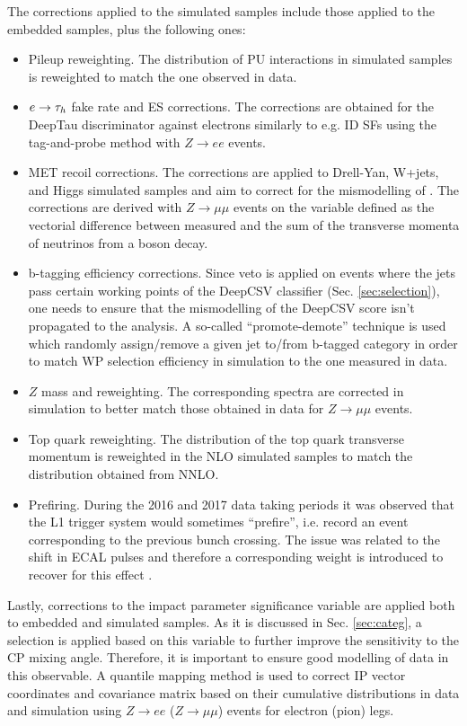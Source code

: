 The corrections applied to the simulated samples include those applied to the embedded samples, plus the following ones:
\begin{itemize}
    \item Pileup reweighting. The distribution of PU interactions in simulated samples is reweighted to match the one observed in data.
    \item $e\to\tau_h$ fake rate and ES corrections. The corrections are obtained for the DeepTau discriminator against electrons similarly to e.g. \tauh ID SFs using the tag-and-probe method with $Z\to ee$ events. 
    \item MET recoil corrections. The corrections are applied to Drell-Yan, W+jets, and Higgs simulated samples and aim to correct for the mismodelling of \met. The corrections are derived with $Z\to\mu\mu$ events on the variable defined as the vectorial difference between measured \met and the sum of the transverse momenta of neutrinos from a boson decay. 
    \item b-tagging efficiency corrections. Since veto is applied on events where the jets pass certain working points of the DeepCSV classifier (Sec. \ref{sec:selection}), one needs to ensure that the mismodelling of the DeepCSV score isn't propagated to the analysis. A so-called \enquote{promote-demote} technique is used which randomly assign/remove a given jet to/from b-tagged category in order to match WP selection efficiency in simulation to the one measured in data.
    \item $Z$ mass and \pt reweighting. The corresponding spectra are corrected in simulation to better match those obtained in data for $Z\to \mu\mu$ events. 
    \item Top quark \pt reweighting. The distribution of the top quark transverse momentum is reweighted in the NLO simulated samples to match the distribution obtained from NNLO.
    \item Prefiring. During the 2016 and 2017 data taking periods it was observed that the L1 trigger system would sometimes \enquote{prefire}, i.e. record an event corresponding to the previous bunch crossing. The issue was related to the shift in ECAL pulses and therefore a corresponding weight is introduced to recover for this effect \cite{CMS:2020cmk}. 
\end{itemize}

Lastly, corrections to the impact parameter significance variable are applied both to embedded and simulated samples. As it is discussed in Sec. \ref{sec:categ}, a selection is applied based on this variable to further improve the sensitivity to the CP mixing angle. Therefore, it is important to ensure good modelling of data in this observable. A quantile mapping method is used to correct IP vector coordinates and covariance matrix based on their cumulative distributions in data and simulation using $Z\to ee$ ($Z\to \mu\mu$) events for electron (pion) legs.  

